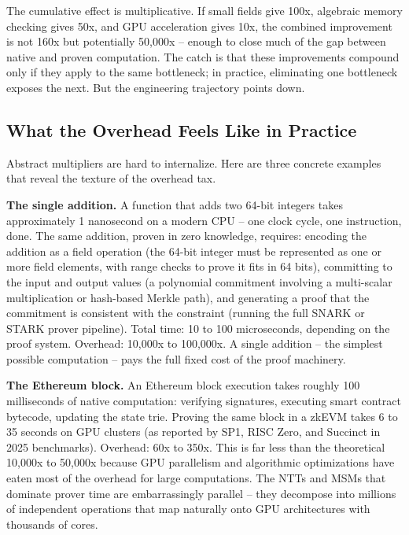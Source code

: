 \documentclass[
  11pt,
  openany]{report}
\renewcommand{\textbf}[1]{{\bfseries\color{MidnightBold}#1}}
\begin{document}
The cumulative effect is multiplicative. If small fields give 100x, algebraic
memory checking gives 50x, and GPU acceleration gives 10x, the combined
improvement is not 160x but potentially 50,000x -- enough to close much of the
gap between native and proven computation. The catch is that these improvements
compound only if they apply to the same bottleneck; in practice, eliminating one
bottleneck exposes the next. But the engineering trajectory points down.

\subsection{What the Overhead Feels Like in
Practice}\label{what-the-overhead-feels-like-in-practice}

Abstract multipliers are hard to internalize. Here are three concrete examples
that reveal the texture of the overhead tax.

\textbf{The single addition.} A function that adds two 64-bit integers takes
approximately 1 nanosecond on a modern CPU -- one clock cycle, one instruction,
done. The same addition, proven in zero knowledge, requires: encoding the
addition as a field operation (the 64-bit integer must be represented as one or
more field elements, with range checks to prove it fits in 64 bits), committing
to the input and output values (a polynomial commitment involving a multi-scalar
multiplication or hash-based Merkle path), and generating a proof that the
commitment is consistent with the constraint (running the full SNARK or STARK
prover pipeline). Total time: 10 to 100 microseconds, depending on the proof
system. Overhead: 10,000x to 100,000x. A single addition -- the simplest
possible computation -- pays the full fixed cost of the proof machinery.

\textbf{The Ethereum block.} An Ethereum block execution takes roughly 100
milliseconds of native computation: verifying signatures, executing smart
contract bytecode, updating the state trie. Proving the same block in a zkEVM
takes 6 to 35 seconds on GPU clusters (as reported by SP1, RISC Zero, and
Succinct in 2025 benchmarks). Overhead: 60x to 350x. This is far less than the
theoretical 10,000x to 50,000x because GPU parallelism and algorithmic
optimizations have eaten most of the overhead for large computations. The NTTs
and MSMs that dominate prover time are embarrassingly parallel -- they decompose
into millions of independent operations that map naturally onto GPU
architectures with thousands of cores.
\end{document}
